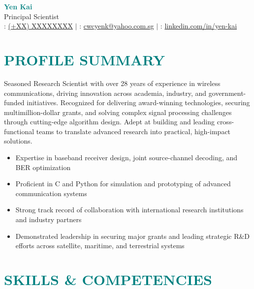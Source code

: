 \documentclass[a4paper, 11pt]{article}
\begin{document}
\begin{center}
	
	\textbf{\Huge \textcolor{teal}{Yen Kai}} \\ \vspace{3pt}
	\Large{Principal Scientist} \\ \vspace{3pt}
	\small
	\faPhone : \href{tel:XXXXXXXX}{(+XX) XXXXXXXX}
	$|$
	\faEnvelope : \href{mailto:cwcyenk@yahoo.com.sg}{cwcyenk@yahoo.com.sg}
	$|$
	\faLinkedinSquare : \href{https://linkedin.com/in/yen-kai}{linkedin.com/in/yen-kai}
	
\end{center}

\section{\textcolor{teal}{\bf{PROFILE SUMMARY}}}

	\vspace{3pt}
	
	Seasoned Research Scientist with over 28 years of experience in wireless communications, driving innovation across academia, industry, and government-funded initiatives. Recognized for delivering award-winning technologies, securing multimillion-dollar grants, and solving complex signal processing challenges through cutting-edge algorithm design. Adept at building and leading cross-functional teams to translate advanced research into practical, high-impact solutions.  
	
	\vspace{2pt}
	
	\begin{itemize}[leftmargin=*, itemsep=-1mm]
		
		\item Expertise in baseband receiver design, joint source-channel decoding, and BER optimization
		\item Proficient in C and Python for simulation and prototyping of advanced communication systems
		\item Strong track record of collaboration with international research institutions and industry partners 
		\item Demonstrated leadership in securing major grants and leading strategic R\&D efforts across satellite, maritime, and terrestrial systems 
		
	\end{itemize}

	
\section{\textcolor{teal}{\bf{SKILLS \& COMPETENCIES}}}
\end{document}
